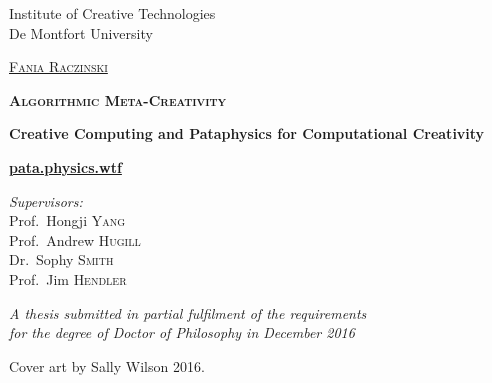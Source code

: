 
\begin{titlingpage}
\begin{center}

Institute of Creative Technologies\\
De Montfort University

\vspace{2cm}

\textsc{\huge \href{http://fania.uk}{Fania Raczinski}}

\vspace{2cm}


\textsc{\bfseries\scshape\sffamily \fontsize{40}{30}\selectfont Algorithmic Meta-Creativity}

\vspace{1.5cm}

{\huge \bfseries Creative Computing and Pataphysics for Computational Creativity}

\vspace{1.5cm}
{\Huge \textbf{\url{pata.physics.wtf}}}
\vspace{2cm}

\emph{Supervisors:}\\
{Prof.\ Hongji \textsc{Yang}}\\
{Prof.\ Andrew \textsc{Hugill}}\\
{Dr.\ Sophy \textsc{Smith}}\\
{Prof.\ Jim \textsc{Hendler}}

\vfill

\large \emph{A thesis submitted in partial fulfilment of the requirements\\ for the degree of Doctor of Philosophy in December 2016}


\end{center}

\clearpage

\vspace*{\fill}

Cover art by Sally Wilson 2016.

\end{titlingpage}
